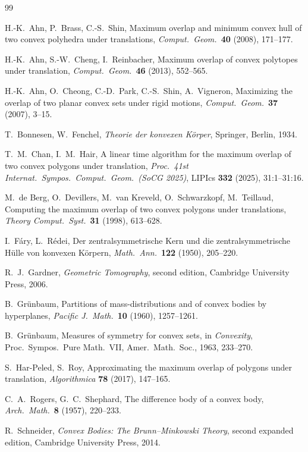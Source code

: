\documentclass[12pt]{article}
\theoremstyle{definition}
\begin{document}
\begin{thebibliography}{99}

H.-K.\ Ahn, P.\ Brass, C.-S.\ Shin,
Maximum overlap and minimum convex hull of two convex polyhedra under
translations,
{\em Comput.\ Geom.}\ {\bf 40} (2008), 171--177.

H.-K.\ Ahn, S.-W.\ Cheng, I.\ Reinbacher,
Maximum overlap of convex polytopes under translation,
{\em Comput.\ Geom.}\ {\bf 46} (2013), 552--565.

H.-K.\ Ahn, O.\ Cheong, C.-D.\ Park, C.-S.\ Shin, A.\ Vigneron,
Maximizing the overlap of two planar convex sets under rigid motions,
{\em Comput.\ Geom.}\ {\bf 37} (2007), 3--15.

T.\ Bonnesen, W.\ Fenchel,
{\em Theorie der konvexen K\"orper},
Springer, Berlin, 1934.

T.\ M.\ Chan, I.\ M.\ Hair,
A linear time algorithm for the maximum overlap of two convex polygons
under translation,
{\em Proc.\ 41st Internat.\ Sympos.\ Comput.\ Geom.\ (SoCG 2025)},
LIPIcs {\bf 332} (2025), 31:1--31:16.

M.\ de Berg, O.\ Devillers, M.\ van Kreveld, O.\ Schwarzkopf,
M.\ Teillaud,
Computing the maximum overlap of two convex polygons under translations,
{\em Theory Comput.\ Syst.}\ {\bf 31} (1998), 613--628.

I.\ F\'ary, L.\ R\'edei,
Der zentralsymmetrische Kern und die zentralsymmetrische H\"ulle von
konvexen K\"orpern,
{\em Math.\ Ann.}\ {\bf 122} (1950), 205--220.

R.\ J.\ Gardner,
{\em Geometric Tomography}, second edition,
Cambridge University Press, 2006.

B.\ Gr\"unbaum,
Partitions of mass-distributions and of convex bodies by hyperplanes,
{\em Pacific J.\ Math.}\ {\bf 10} (1960), 1257--1261.

B.\ Gr\"unbaum,
Measures of symmetry for convex sets,
in {\em Convexity}, Proc.\ Sympos.\ Pure Math.\ VII,
Amer.\ Math.\ Soc., 1963, 233--270.

S.\ Har-Peled, S.\ Roy,
Approximating the maximum overlap of polygons under translation,
{\em Algorithmica} {\bf 78} (2017), 147--165.

C.\ A.\ Rogers, G.\ C.\ Shephard,
The difference body of a convex body,
{\em Arch.\ Math.}\ {\bf 8} (1957), 220--233.

R.\ Schneider,
{\em Convex Bodies: The Brunn--Minkowski Theory},
second expanded edition, Cambridge University Press, 2014.

\end{thebibliography}
\end{document}
